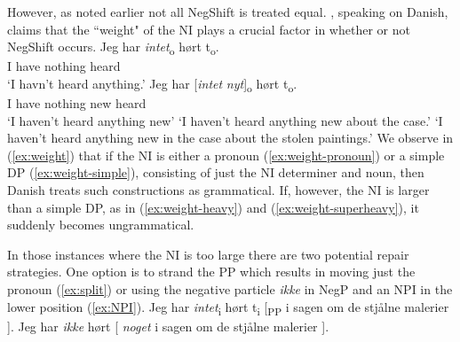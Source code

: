 \documentclass[12pt, letterpaper]{article}
\begin{document}
However, as noted earlier not all NegShift is treated equal. \citet[65f]{christensenInterfacesNegationSyntax2005}, speaking on Danish, claims that the ``weight" of the NI plays a crucial factor in whether or not NegShift occurs. 
	\ea \label{ex:weight}
		\ea \label{ex:weight-pronoun}
		\gll Jeg har \textit{intet}\textsubscript{o} hørt t\textsubscript{o}.\\
		I have nothing heard\\
		\glt  `I havn't heard anything.'
		\ex \label{ex:weight-simple}
		\gll Jeg har [\textit{intet} \textit{nyt}]\textsubscript{o} hørt t\textsubscript{o}.\\
		I have nothing new heard\\
		\glt `I haven't heard anything new'
		\glt `I haven't heard anything new about the case.' \label{ex:weight-heavy}
		\glt `I haven't heard anything new in the case about the stolen paintings.' \label{ex:weight-superheavy}
		\z 
	\z
We observe in (\ref{ex:weight}) that if the NI is either a pronoun (\ref{ex:weight-pronoun}) or a simple DP (\ref{ex:weight-simple}), consisting of just the NI determiner and noun, then Danish treats such constructions as grammatical. If, however, the NI is larger than a simple DP, as in (\ref{ex:weight-heavy}) and (\ref{ex:weight-superheavy}), it suddenly becomes ungrammatical. 

In those instances where the NI is too large there are two potential repair strategies. One option is to strand the PP which results in moving just the pronoun (\ref{ex:split}) or using the negative particle \textit{ikke} in NegP and an NPI in the lower position (\ref{ex:NPI}).
	\ea 
		\ea Jeg har \textit{intet}\textsubscript{i} hørt t\textsubscript{i} [\textsubscript{PP} i sagen om de stjålne malerier ]. \label{ex:split}
		\ex Jeg har \textit{ikke} hørt [ \textit{noget} i sagen om de stjålne malerier ]. \label{ex:NPI}
		\z 
	\z  
\end{document}

